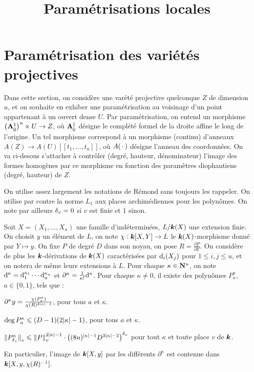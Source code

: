 \documentclass{mpg-preth}
\title{Paramétrisations locales}
\begin{document}
\maketitle

\section{Paramétrisation des variétés projectives}

Dans cette section, on considère une varété projective quelconque $Z$ de
dimension $u$, et on souhaite en exhiber une paramétrisation au voisinage d'un
point appartenant à un ouvert dense $U$. Par paramétrisation, on entend un
morphisme $\big(\mathbf{A}^1_{\hat{0}}\big)^u \times U \to Z$, où $\mathbf{A}^1_{\hat{0}}$
désigne le complété formel de la droite affine le long de l'origine. Un tel
morphisme correspond à un morphisme (continu) d'anneaux $A(Z) \to A(U)[[t_1,
\ldots, t_u]]$, où $A({\,\cdot\,})$ désigne l'anneau des coordonnées. On va ci-desous
s'attacher à contrôler (degré, hauteur, dénominateur) l'image des formes
homogènes par ce morphisme en fonction des paramètres diophantiens (degré,
hauteur) de $Z$.

On utilise assez largement les notations de Rémond sans toujours les rappeler.
On utilise par contre la norme $L_1$ aux places archimédiennes pour les
polynômes. On note par ailleurs ${\delta\smash{_v}} = 0$ si $v$ est finie et $1$ sinon.

\begin{lem}
  Soit $X = (X_1, \dots, X_u)$ une famille d'indéterminées, $L / \boldsymbol{k}(X)$ une
  extension finie. On choisit $y$ un élément de $L$, on note $\chi : \boldsymbol{k}[X, Y]
  \to L$ le $\boldsymbol{k}(X)$-morphisme donné par $Y \mapsto y$. On fixe $P$ de degré
  $D$ dans son noyau, on pose $R = \frac{\partial P}{\partial Y}$. On considère
  de plus les $\boldsymbol{k}$-dérivations de $\boldsymbol{k}(X)$ caractérisées par $\mathrm d_i(X_j)$
  pour $1 \le i, j \le u$, et on notera de même leurs extensions à $L$. Pour
  chaque $\kappa \in \mathbf{N}^u$, on note $\mathrm d^\kappa = \mathrm d_1^{\kappa_1}\cdots
  \mathrm d_u^{\kappa_u}$ et $\partial^\kappa = \frac1{\kappa!}\mathrm d^\kappa$. Pour
  chaque $\kappa \neq 0$, il existe des polynômes $P_a^\kappa$, $a \in \{0,
  1\}$, tels que :
  \begin{enumthm}
    \item $\partial^\kappa y =
      \frac{\chi(P_a^\kappa)}{\chi(R)^{2{\lvert\kappa\rvert}-1}}$, \label{i-repres}
      pour tous $a$ et $\kappa$.
    \item $\deg P_a^\kappa \leqslant (D -1)(2 {\lvert\kappa\rvert} -1)$,
      pour tous $a$ et $\kappa$.
    \item $\left\lVert P_{\delta\smash{_v}}^{\kappa}\right\rVert_{v} \leqslant \left\lVert P\right\rVert_{v} ^{2{\lvert\kappa\rvert} - 1}
      \cdot \left((8u)^{{\lvert\kappa\rvert} -1} D^{3{\lvert\kappa\rvert} -2} \right)^{\delta\smash{_v}}$
      pour tout $\kappa$ et toute place $v$ de $\boldsymbol{k}$.
  \end{enumthm}
  En particulier, l'image de $\boldsymbol{k}[X, y]$ par les différents $\partial^\kappa$
  est contenue dans $\boldsymbol{k}[X, y, \chi(R)^{-1}]$.
\end{lem}
\end{document}
